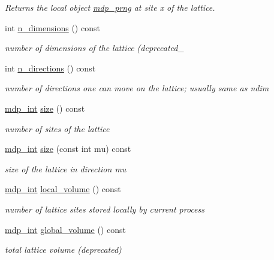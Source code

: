 \begin{DoxyCompactItemize}
\begin{DoxyCompactList}\small\item\em Returns the local object \hyperlink{classmdp__prng}{mdp\+\_\+prng} at site x of the lattice. \end{DoxyCompactList}\item 
int \hyperlink{classmdp__lattice_a347e54e6c3dde2f2d7d5bef76ec0b1f5}{n\+\_\+dimensions} () const
\begin{DoxyCompactList}\small\item\em number of dimensions of the lattice (deprecated\+\_\+ \end{DoxyCompactList}\item 
int \hyperlink{classmdp__lattice_afc12335416009cc673581a014137ef3f}{n\+\_\+directions} () const
\begin{DoxyCompactList}\small\item\em number of directions one can move on the lattice; usually same as ndim \end{DoxyCompactList}\item 
\hyperlink{mdp__global__vars_8h_aaa1ad9d0dcd2124aa5af0120d9954174}{mdp\+\_\+int} \hyperlink{classmdp__lattice_a587b4d64f806f7acf5787cb6a11b7568}{size} () const
\begin{DoxyCompactList}\small\item\em number of sites of the lattice \end{DoxyCompactList}\item 
\hyperlink{mdp__global__vars_8h_aaa1ad9d0dcd2124aa5af0120d9954174}{mdp\+\_\+int} \hyperlink{classmdp__lattice_a94123e8ac3bdc0b40578c28fd3d64e39}{size} (const int mu) const
\begin{DoxyCompactList}\small\item\em size of the lattice in direction mu \end{DoxyCompactList}\item 
\hyperlink{mdp__global__vars_8h_aaa1ad9d0dcd2124aa5af0120d9954174}{mdp\+\_\+int} \hyperlink{classmdp__lattice_a403541fd428a4d7245c175dda22fdafd}{local\+\_\+volume} () const
\begin{DoxyCompactList}\small\item\em number of lattice sites stored locally by current process \end{DoxyCompactList}\item 
\hyperlink{mdp__global__vars_8h_aaa1ad9d0dcd2124aa5af0120d9954174}{mdp\+\_\+int} \hyperlink{classmdp__lattice_afe36f738c7dba2e8c2bfde1615285367}{global\+\_\+volume} () const
\begin{DoxyCompactList}\small\item\em total lattice volume (deprecated) \end{DoxyCompactList}\item 

\end{DoxyCompactItemize}
